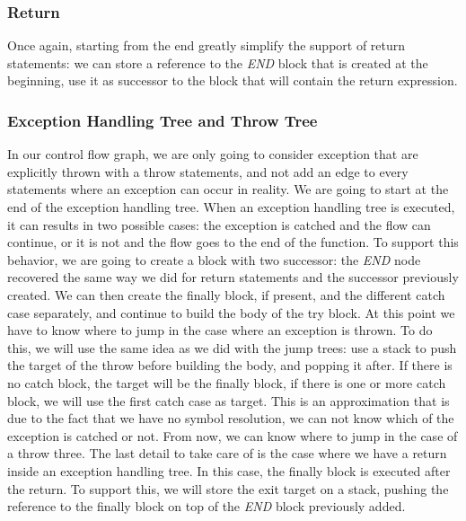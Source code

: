 \subsubsection{Return}
\label{subsubsec:return_cfg}
Once again, starting from the end greatly simplify the support of return statements: we can store a reference to the \emph{END} block that is created at the beginning, use it as successor to the block that will contain the return expression.

\subsubsection{Exception Handling Tree and Throw Tree}
\label{subsubsec:exception_handling_cfg}
In our control flow graph, we are only going to consider exception that are explicitly thrown with a throw statements, and not add an edge to every statements where an exception can occur in reality. \newline
We are going to start at the end of the exception handling tree. 
When an exception handling tree is executed, it can results in two possible cases: the exception is catched and the flow can continue, or it is not and the flow goes to the end of the function. 
To support this behavior, we are going to create a block with two successor: the \emph{END} node recovered the same way we did for return statements and the successor previously created. \newline
We can then create the finally block, if present, and the different catch case separately, and continue to build the body of the try block. 
At this point we have to know where to jump in the case where an exception is thrown. 
To do this, we will use the same idea as we did with the jump trees: use a stack to push the target of the throw before building the body, and popping it after. 
If there is no catch block, the target will be the finally block, if there is one or more catch block, we will use the first catch case as target. 
This is an approximation that is due to the fact that we have no symbol resolution, we can not know which of the exception is catched or not. 
From now, we can know where to jump in the case of a throw three.\newline
The last detail to take care of is the case where we have a return inside an exception handling tree. 
In this case, the finally block is executed after the return. 
To support this, we will store the exit target on a stack, pushing the reference to the finally block on top of the \emph{END} block previously added.

